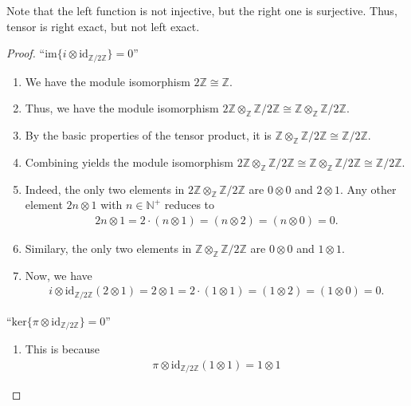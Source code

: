 \documentclass[a4paper]{book}
\theoremstyle{definition}
\begin{document}
Note that the left function is not injective, but the right one is surjective.
Thus, tensor is right exact, but not left exact.

\begin{proof}
``\(\text{im} \{ i \otimes \text{id}_{\mathbb{Z} / 2 \mathbb{Z}} \} = 0\)''
\begin{enumerate}
    \item We have the module isomorphism \(2 \mathbb{Z} \cong \mathbb{Z}\).
    \item Thus, we have the module isomorphism \(2 \mathbb{Z} \otimes_\mathbb{Z} \mathbb{Z} / 2 \mathbb{Z} \cong \mathbb{Z} \otimes_\mathbb{Z} \mathbb{Z} / 2 \mathbb{Z}\).
    \item By the basic properties of the tensor product, it is \(\mathbb{Z} \otimes_\mathbb{Z} \mathbb{Z} / 2 \mathbb{Z} \cong \mathbb{Z} / 2 \mathbb{Z}\).
    \item Combining yields the module isomorphism \(2 \mathbb{Z} \otimes_\mathbb{Z} \mathbb{Z} / 2 \mathbb{Z} \cong \mathbb{Z} \otimes_\mathbb{Z} \mathbb{Z} / 2 \mathbb{Z} \cong \mathbb{Z} / 2 \mathbb{Z}\).
    \item Indeed, the only two elements in \(2 \mathbb{Z} \otimes_\mathbb{Z} \mathbb{Z} / 2 \mathbb{Z}\) are \(0 \otimes 0\) and \(2 \otimes 1\). Any other element \(2n \otimes 1\) with \(n \in \mathbb{N}^+\) reduces to \begin{align*}
        2n \otimes 1 = 2 \cdot (n \otimes 1) = (n \otimes 2) = (n \otimes 0) = 0 \text{.}
    \end{align*}
    \item Similary, the only two elements in \(\mathbb{Z} \otimes_\mathbb{Z} \mathbb{Z} /2 \mathbb{Z}\) are \(0 \otimes 0\) and \(1 \otimes 1\).
    \item Now, we have \begin{align*}
        i \otimes \text{id}_{\mathbb{Z} / 2 \mathbb{Z}} (2 \otimes 1) = 2 \otimes 1 = 2 \cdot (1 \otimes 1) = (1 \otimes 2) = (1 \otimes 0) = 0 \text{.}
    \end{align*}
\end{enumerate}
``\(\text{ker} \{ \pi \otimes \text{id}_{\mathbb{Z} / 2 \mathbb{Z} } \} = 0\)''
\begin{enumerate}
    \item This is because \begin{align*}
        \pi \otimes \text{id}_{\mathbb{Z} / 2 \mathbb{Z}} (1 \otimes 1) =  1 \otimes 1
    \end{align*}
\end{enumerate}    
\end{proof}
\end{document}

